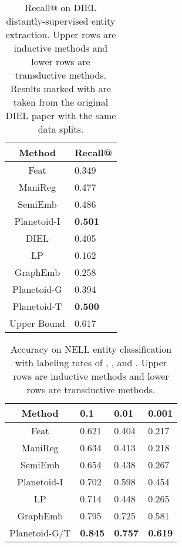 \begin{table}[tb]
\caption{Recall@ on DIEL distantly-supervised entity extraction. Upper rows are inductive methods and lower rows are transductive methods. Results marked with  are taken from the original DIEL paper \cite{bingimproving} with the same data splits.}
\label{tab:distant}
\vskip 0.15in
\begin{center}
\begin{small}
\begin{sc}
\begin{tabular}{cl}
Method & Recall@ \\
\hline
\abovespace
Feat & 0.349 \\
ManiReg & 0.477 \\
SemiEmb & 0.486 \\
Planetoid-I & \textbf{0.501} \\
\hline
\abovespace
DIEL & 0.405 \\
LP & 0.162 \\
GraphEmb & 0.258 \\
Planetoid-G & 0.394 \\
Planetoid-T & \textbf{0.500} \\
\hline
\abovespace
Upper Bound & 0.617 \\
\end{tabular}
\end{sc}
\end{small}
\end{center}
\vskip -0.1in
\end{table}

\begin{table}[tb]
\caption{Accuracy on NELL entity classification with labeling rates of 
, , and . Upper rows are inductive methods and lower rows are transductive methods.}
\label{tab:entity}
\vskip 0.15in
\begin{center}
\begin{small}
\begin{sc}
\begin{tabular}{clll}
Method & 0.1 & 0.01 & 0.001 \\
\hline
\abovespace
Feat & 0.621 & 0.404 & 0.217 \\
ManiReg & 0.634 & 0.413 & 0.218 \\
SemiEmb & 0.654 & 0.438 & 0.267 \\
Planetoid-I & 0.702 & 0.598 & 0.454 \\
\hline
\abovespace
LP & 0.714 & 0.448 & 0.265 \\
GraphEmb & 0.795 & 0.725 & 0.581 \\
Planetoid-G/T & \textbf{0.845} & \textbf{0.757} & \textbf{0.619} \\
\end{tabular}
\end{sc}
\end{small}
\end{center}
\vskip -0.1in
\end{table}


